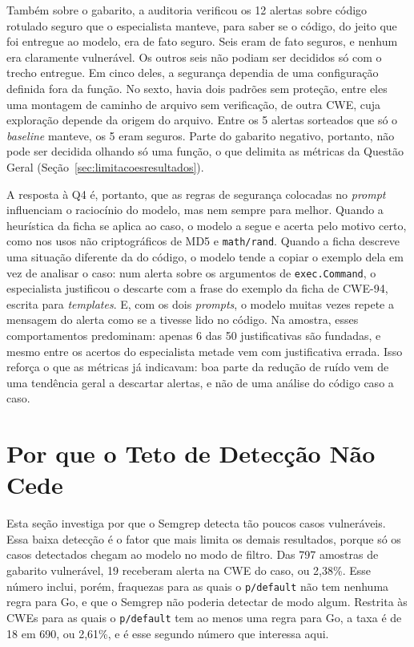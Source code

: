 Também sobre o gabarito, a auditoria verificou os 12 alertas sobre código rotulado seguro que o especialista manteve, para saber se o código, do jeito que foi entregue ao modelo, era de fato seguro. Seis eram de fato seguros, e nenhum era claramente vulnerável. Os outros seis não podiam ser decididos só com o trecho entregue. Em cinco deles, a segurança dependia de uma configuração definida fora da função. No sexto, havia dois padrões sem proteção, entre eles uma montagem de caminho de arquivo sem verificação, de outra CWE, cuja exploração depende da origem do arquivo. Entre os 5 alertas sorteados que só o \textit{baseline} manteve, os 5 eram seguros. Parte do gabarito negativo, portanto, não pode ser decidida olhando só uma função, o que delimita as métricas da Questão Geral (Seção~\ref{sec:limitacoesresultados}).

A resposta à Q4 é, portanto, que as regras de segurança colocadas no \textit{prompt} influenciam o raciocínio do modelo, mas nem sempre para melhor. Quando a heurística da ficha se aplica ao caso, o modelo a segue e acerta pelo motivo certo, como nos usos não criptográficos de MD5 e \texttt{math/rand}. Quando a ficha descreve uma situação diferente da do código, o modelo tende a copiar o exemplo dela em vez de analisar o caso: num alerta sobre os argumentos de \texttt{exec.Command}, o especialista justificou o descarte com a frase do exemplo da ficha de CWE-94, escrita para \textit{templates}. E, com os dois \textit{prompts}, o modelo muitas vezes repete a mensagem do alerta como se a tivesse lido no código. Na amostra, esses comportamentos predominam: apenas 6 das 50 justificativas são fundadas, e mesmo entre os acertos do especialista metade vem com justificativa errada. Isso reforça o que as métricas já indicavam: boa parte da redução de ruído vem de uma tendência geral a descartar alertas, e não de uma análise do código caso a caso.

\section{Por que o Teto de Detecção Não Cede}
\label{sec:eliminacao}

Esta seção investiga por que o Semgrep detecta tão poucos casos vulneráveis. Essa baixa detecção é o fator que mais limita os demais resultados, porque só os casos detectados chegam ao modelo no modo de filtro. Das 797 amostras de gabarito vulnerável, 19 receberam alerta na CWE do caso, ou 2,38\%. Esse número inclui, porém, fraquezas para as quais o \texttt{p/default} não tem nenhuma regra para Go, e que o Semgrep não poderia detectar de modo algum. Restrita às CWEs para as quais o \texttt{p/default} tem ao menos uma regra para Go, a taxa é de 18 em 690, ou 2,61\%, e é esse segundo número que interessa aqui.

